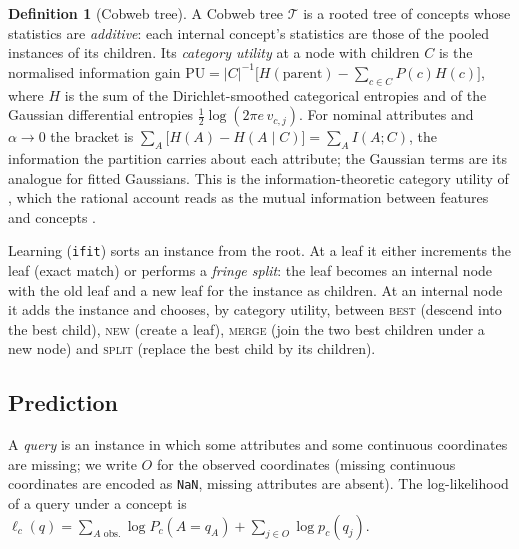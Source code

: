 \documentclass[11pt]{article}
\theoremstyle{definition}
\newtheorem{definition}[theorem]{Definition}
\theoremstyle{remark}
\newcommand{\T}{\mathcal{T}}
\begin{document}
\begin{definition}[Cobweb tree]
A Cobweb tree $\T$ is a rooted tree of concepts whose statistics are \emph{additive}:
each internal concept's statistics are those of the pooled instances of its children.
Its \emph{category utility} at a node with children $C$ is the normalised information
gain $\mathrm{PU}=|C|^{-1}\bigl[H(\text{parent})-\sum_{c\in C}P(c)H(c)\bigr]$, where
$H$ is the sum of the Dirichlet-smoothed categorical entropies and of the Gaussian
differential entropies $\tfrac12\log(2\pi e\,v_{c,j})$.  For nominal attributes and
$\alpha\to0$ the bracket is $\sum_A\bigl[H(A)-H(A\mid C)\bigr]=\sum_AI(A;C)$, the
information the partition carries about each attribute; the Gaussian terms are its
analogue for fitted Gaussians.  This is the information-theoretic category utility of
\citet{corter1992}, which the rational account reads as the mutual information between
features and concepts \citep{maclellan2026rational}.
\end{definition}

Learning (\texttt{ifit}) sorts an instance from the root.  At a leaf it either
increments the leaf (exact match) or performs a \emph{fringe split}: the leaf becomes an
internal node with the old leaf and a new leaf for the instance as children.  At an
internal node it adds the instance and chooses, by category utility, between
\textsc{best} (descend into the best child), \textsc{new} (create a leaf),
\textsc{merge} (join the two best children under a new node) and \textsc{split}
(replace the best child by its children).

\subsection{Prediction}

A \emph{query} is an instance in which some attributes and some continuous
coordinates are missing; we write $O$ for the observed coordinates (missing continuous
coordinates are encoded as \texttt{NaN}, missing attributes are absent).  The
log-likelihood of a query under a concept is
$\ell_c(q)=\sum_{A\text{ obs.}}\log P_c(A{=}q_A)+\sum_{j\in O}\log p_c(q_j)$.
\end{document}
